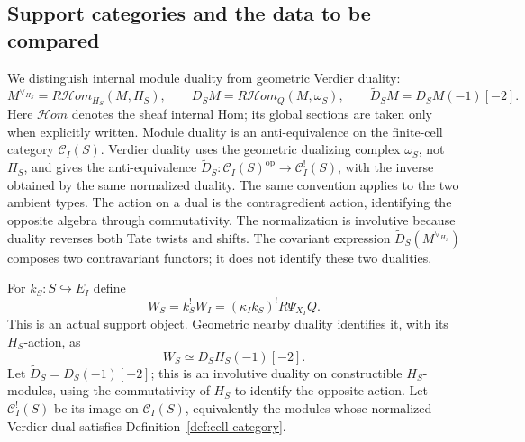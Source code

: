 \documentclass[11pt]{article}
\theoremstyle{definition}
\theoremstyle{remark}
\begin{document}
\subsection{Support categories and the data to be compared}
We distinguish internal module duality from geometric Verdier duality:
\[
 M^{\vee_{H_S}}=R\mathcal Hom_{H_S}(M,H_S),\qquad
 D_SM=R\mathcal Hom_Q(M,\omega_S),\qquad
 \widetilde D_SM=D_SM(-1)[-2].
\]
Here $\mathcal Hom$ denotes the sheaf internal Hom; its global sections
are taken only when explicitly written.  Module duality is an
anti-equivalence on the finite-cell category $\mathcal C_I(S)$.
Verdier duality uses the geometric dualizing complex $\omega_S$, not
$H_S$, and gives the anti-equivalence
$\widetilde D_S:\mathcal C_I(S)^{\mathrm{op}}\to\mathcal C_I^!(S)$,
with the inverse obtained by the same normalized duality.  The same
convention applies to the two ambient types.  The action on a dual
is the contragredient action, identifying the opposite algebra through
commutativity.  The normalization is involutive because duality reverses
both Tate twists and shifts.  The covariant expression
$\widetilde D_S(M^{\vee_{H_S}})$ composes two contravariant functors;
it does not identify these two dualities.

For $k_S:S\hookrightarrow E_I$ define
\[
 W_S=k_S^!W_I=(\kappa_Ik_S)^!R\Psi_{X_I}Q.
\]
This is an actual support object.  Geometric nearby duality identifies
it, with its $H_S$-action, as
\[
 W_S\simeq D_S H_S(-1)[-2].
\]
Let $\widetilde D_S=D_S(-1)[-2]$; this is an involutive duality on
constructible $H_S$-modules, using the commutativity of $H_S$ to
identify the opposite action.  Let $\mathcal C_I^!(S)$ be its image
on $\mathcal C_I(S)$, equivalently the modules whose normalized
Verdier dual satisfies Definition~\ref{def:cell-category}.
\end{document}
